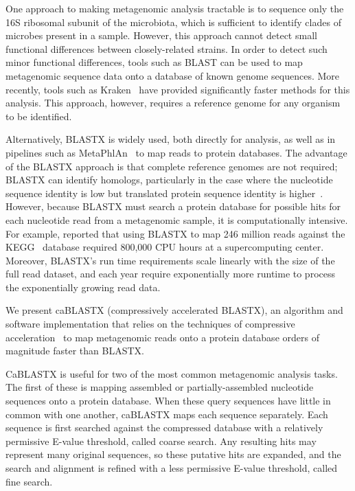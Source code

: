 \documentclass{amsbook}
\theoremstyle{definition}
\theoremstyle{remark}
\numberwithin{equation}{section}
\begin{document}
One approach to making metagenomic analysis tractable is to
sequence only the 16S ribosomal subunit of the microbiota, which is sufficient
to identify clades of microbes present in a sample. 
However, this approach cannot detect small functional differences between 
closely-related strains. 
In order to detect such minor functional differences, tools such as BLAST can 
be used to map metagenomic sequence data onto a database of known genome
sequences.
More recently, tools such as Kraken~\cite{kraken} have provided significantly 
faster methods for this analysis.
This approach, however, requires a reference genome for any organism to be
identified.

Alternatively, BLASTX is widely used, both directly for analysis, as well as in 
pipelines such as MetaPhlAn~\cite{Huttenhower} to map reads to protein 
databases.
The advantage of the BLASTX approach is that complete reference genomes are not
required; BLASTX can identify homologs, particularly in the case where the
nucleotide sequence identity is low but translated protein sequence identity
is higher~\cite{Turnbaugh:2006, Kurokawa:2007}.
However, because BLASTX must search a protein database for possible hits for
each nucleotide read from a metagenomic sample, it is computationally intensive.
For example, \citet{Mackelprang:2011} reported that using BLASTX to map 246
million reads against the KEGG~\cite{kegg} database required 800,000 CPU hours
at a supercomputing center.
Moreover, BLASTX's run time requirements scale linearly with the size of the 
full read dataset, and each year require exponentially more runtime to process 
the exponentially growing read data. 


We present caBLASTX (compressively accelerated BLASTX), an algorithm and 
software implementation that relies on the techniques of compressive 
acceleration~\cite{Loh, Daniels} to map metagenomic reads onto a protein 
database orders of magnitude faster than BLASTX.

CaBLASTX is useful for two of the most common metagenomic analysis tasks. 
The first of these is mapping assembled or partially-assembled
nucleotide sequences onto a protein database. 
When these query sequences have
little in common with one another, caBLASTX maps each sequence separately. 
Each sequence is first searched against the compressed database with a 
relatively permissive E-value threshold, called coarse search. 
Any resulting hits may represent many original sequences, so these putative 
hits are expanded, and the search and alignment is refined with a less 
permissive E-value threshold, called fine search.
\end{document}
